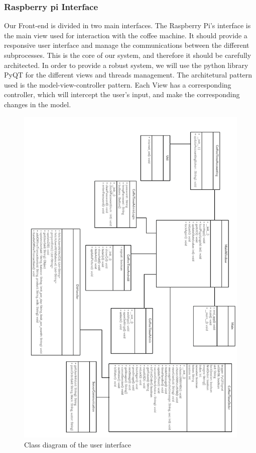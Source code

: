 \documentclass[12pt]{article}
\begin{document}
  \subsubsection{Raspberry pi Interface} \label{sec:raspberry}
   
   Our Front-end is divided in two main interfaces.
   The Raspberry Pi's interface is the main view used for interaction with the coffee machine. 
   It should provide a responsive user interface and manage the communications between the different subprocesses.
   This is the core of our system, and therefore it should be carefully architected. In order to 
   provide a robust system, 
   we will use the python library PyQT for the different views and threads management.
   The architetural pattern used is the model-view-controller pattern. 
   Each View has a corresponding controller, which will intercept the user's input, and make the corresponding changes in the model.
   
   \begin{figure}[H]
   \centering
   \includegraphics[width= 15cm]{./images/viewsClasses}
   \captionsetup{justification=centering}
   \caption{Class diagram of the user interface}
   \label{fig:viewsclasses}
  \end{figure}
  
\end{document}
